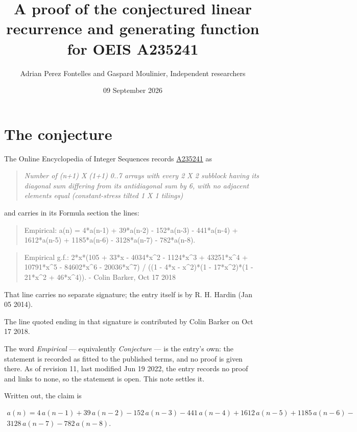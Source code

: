 \documentclass[11pt]{article}
\title{A proof of the conjectured linear recurrence and generating function for OEIS A235241}
\author{Adrian Perez Fontelles and Gaspard Moulinier, Independent researchers}
\date{09 September 2026}
\theoremstyle{definition}
\begin{document}
\maketitle
\section{The conjecture}

The Online Encyclopedia of Integer Sequences records \href{https://oeis.org/A235241}{A235241} as

\begin{quote}\itshape Number of (n+1) X (1+1) 0..7 arrays with every 2 X 2 subblock having its diagonal sum differing from its antidiagonal sum by 6, with no adjacent elements equal (constant-stress tilted 1 X 1 tilings)\end{quote}

and carries in its Formula section the lines:

\begin{quote}\ttfamily Empirical: a(n) = 4*a(n-1) + 39*a(n-2) - 152*a(n-3) - 441*a(n-4) + 1612*a(n-5) + 1185*a(n-6) - 3128*a(n-7) - 782*a(n-8).\end{quote}

\begin{quote}\ttfamily Empirical g.f.: 2*x*(105 + 33*x - 4034*x\textasciicircum{}2 - 1124*x\textasciicircum{}3 + 43251*x\textasciicircum{}4 + 10791*x\textasciicircum{}5 - 84602*x\textasciicircum{}6 - 20036*x\textasciicircum{}7) / ((1 - 4*x - x\textasciicircum{}2)*(1 - 17*x\textasciicircum{}2)*(1 - 21*x\textasciicircum{}2 + 46*x\textasciicircum{}4)). - Colin Barker, Oct 17 2018\end{quote}

That line carries no separate signature; the entry itself is by R. H. Hardin (Jan 05 2014).

The line quoted ending in that signature is contributed by Colin Barker on Oct 17 2018.

The word {\itshape Empirical} --- equivalently {\itshape Conjecture} --- is the entry's own: the statement is recorded as fitted to the published terms, and no proof is given there. As of revision 11, last modified Jun 19 2022, the entry records no proof and links to none, so the statement is open. This note settles it.

Written out, the claim is

\begin{multline*} a(n) = 4\,a(n-1) + 39\,a(n-2) - 152\,a(n-3) - 441\,a(n-4) + 1612\,a(n-5) + 1185\,a(n-6) - \\ 3128\,a(n-7) - 782\,a(n-8). \end{multline*}
\end{document}
